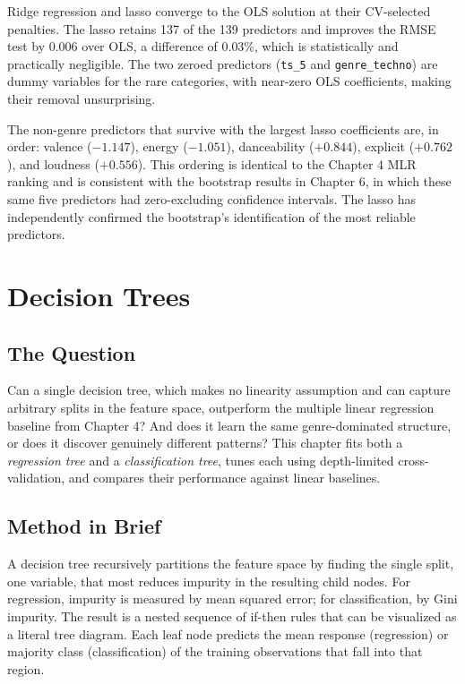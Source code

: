 \documentclass[12pt, oneside]{book}
\begin{document}
Ridge regression and lasso converge to the OLS solution at their CV-selected penalties. The lasso retains 137 of the 139 predictors and improves the RMSE test by 0.006 over OLS, a difference of 0.03\%, which is statistically and practically negligible. The two zeroed predictors (\texttt{ts\_5} and \texttt{genre\_techno}) are dummy variables for the rare categories, with near-zero OLS coefficients, making their removal unsurprising.
 
The non-genre predictors that survive with the largest lasso coefficients are, in order: valence ($-1.147$), energy ($-1.051$), danceability ($+0.844$), explicit ($+0.762$), and loudness ($+0.556$). This ordering is identical to the Chapter 4 MLR ranking and is consistent with the bootstrap results in Chapter 6, in which these same five predictors had zero-excluding confidence intervals. The lasso has independently confirmed the bootstrap's identification of the most reliable predictors.
 
\chapter{Decision Trees}
 
\section{The Question}
 
Can a single decision tree, which makes no linearity assumption and can capture arbitrary splits in the feature space, outperform the multiple linear regression baseline from Chapter 4? And does it learn the same genre-dominated structure, or does it discover genuinely different patterns? This chapter fits both a \textit{regression tree} and a \textit{classification tree}, tunes each using depth-limited cross-validation, and compares their performance against linear baselines.
 
\section{Method in Brief}
 
A decision tree recursively partitions the feature space by finding the single split, one variable, that most reduces impurity in the resulting child nodes. For regression, impurity is measured by mean squared error; for classification, by Gini impurity. The result is a nested sequence of if-then rules that can be visualized as a literal tree diagram. Each leaf node predicts the mean response (regression) or majority class (classification) of the training observations that fall into that region.
 
\end{document}
